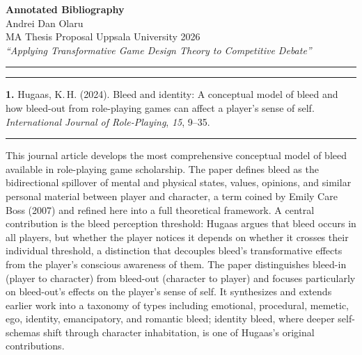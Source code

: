 \documentclass[11pt, a4paper]{article}
\newcommand{\entry}[3]{%
  \vspace{1.8em}
  {\color{rulegray}\rule{\linewidth}{0.4pt}}
  \vspace{0.5em}

  \noindent
  {\large\bfseries\color{accent}#1.}\enspace
  {\normalsize #2}%
  \enspace{\small\scshape\color{taggray}[#3]}

  \vspace{0.35em}
  {\color{accent}\rule{\linewidth}{1.2pt}}
  \vspace{0.2em}
}
\begin{document}
\begin{center}
  {\LARGE\bfseries\color{accent} Annotated Bibliography}\\[0.55em]
  {\large Andrei Dan Olaru}\\[0.25em]
  {\normalsize MA Thesis Proposal \textperiodcentered{} Uppsala University \textperiodcentered{} 2026}\\[0.2em]
  {\normalsize\itshape ``Applying Transformative Game Design Theory to Competitive Debate''}
\end{center}

{\color{accent}\rule{\linewidth}{1.8pt}}

\entry{1}{Hugaas, K.\,H. (2024). Bleed and identity: A conceptual model of bleed and
how bleed-out from role-playing games can affect a player's sense of self.
\textit{International Journal of Role-Playing}, \textit{15}, 9--35.}{Theoretical Framework}

This journal article develops the most comprehensive conceptual model of bleed
available in role-playing game scholarship. The paper defines bleed as the
bidirectional spillover of mental and physical states, values, opinions, and
similar personal material between player and character, a term coined by
Emily Care Boss (2007) and refined here into a full theoretical framework. A central contribution is the bleed perception threshold: Hugaas
argues that bleed occurs in all players, but whether the player notices it
depends on whether it crosses their individual threshold, a distinction that
decouples bleed's transformative effects from the player's conscious awareness
of them. The paper distinguishes bleed-in (player to character) from bleed-out
(character to player) and focuses particularly on bleed-out's effects on the
player's sense of self. It synthesizes and extends earlier work into a taxonomy
of types including emotional, procedural, memetic, ego, identity, emancipatory,
and romantic bleed; identity bleed, where deeper self-schemas shift through
character inhabitation, is one of Hugaas's original contributions.
\end{document}
